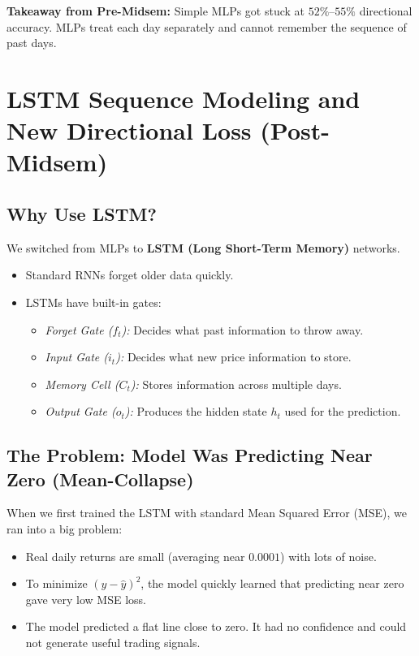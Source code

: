 \textbf{Takeaway from Pre-Midsem:} Simple MLPs got stuck at $52\%$--$55\%$ directional accuracy. MLPs treat each day separately and cannot remember the sequence of past days.

\section{LSTM Sequence Modeling and New Directional Loss (Post-Midsem)}

\subsection{Why Use LSTM?}
We switched from MLPs to \textbf{LSTM (Long Short-Term Memory)} networks.
\begin{itemize}[leftmargin=1.5cm, itemsep=1pt]
	\item Standard RNNs forget older data quickly.
	\item LSTMs have built-in gates:
	\begin{itemize}
		\item \textit{Forget Gate ($f_t$):} Decides what past information to throw away.
		\item \textit{Input Gate ($i_t$):} Decides what new price information to store.
		\item \textit{Memory Cell ($C_t$):} Stores information across multiple days.
		\item \textit{Output Gate ($o_t$):} Produces the hidden state $h_t$ used for the prediction.
	\end{itemize}
\end{itemize}

\subsection{The Problem: Model Was Predicting Near Zero (Mean-Collapse)}
When we first trained the LSTM with standard Mean Squared Error (MSE), we ran into a big problem:
\begin{itemize}[leftmargin=1.5cm, itemsep=1pt]
	\item Real daily returns are small (averaging near $0.0001$) with lots of noise.
	\item To minimize $(y - \hat{y})^2$, the model quickly learned that predicting near zero gave very low MSE loss.
	\item The model predicted a flat line close to zero. It had no confidence and could not generate useful trading signals.
\end{itemize}

